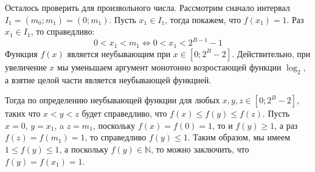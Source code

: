 Осталось проверить для произвольного числа. Рассмотрим сначало интервал \(I_1 = (m_0; m_1) = (0; m_1)\). Пусть \(x_1 \in I_1\), тогда покажем, что \(f(x_1) = 1\). Раз \(x_1 \in I_1\), то справедливо:
\begin{dmath*}
    0 < x_1 < m_1 \Leftrightarrow 0 <  x_1 < 2^{B-1} - 1
\end{dmath*}
Функция $f(x)$ является неубывающим при \(x \in [0; 2^B - 2]\). Действительно, при увеличение \(x\) мы уменьшаем аргумент монотонно возростающей функции \(\log_2\), а взятие целой части является неубывающей функцией.

Тогда по определению неубывающей функции для любых \(x, y, z \in [0; 2^B - 2]\), таких что \(x < y < z\) будет справедливо, что \(f(x) \le f(y) \le f(z)\). Пусть \(x = 0\), \(y = x_1\), a \(z = m_1\), поскольку \(f(x) = f(0) = 1\), то и \(f(y) \ge 1\), а раз \(f(z) = f(m_1) = 1\), то справедливо \(f(y) \le 1\). Таким образом, мы имеем \(1 \le f(y) \le 1\), а поскольку \(f(y) \in \mathbb{N}\), то можно заключить, что \(f(y) = f(x_1) = 1\).  

